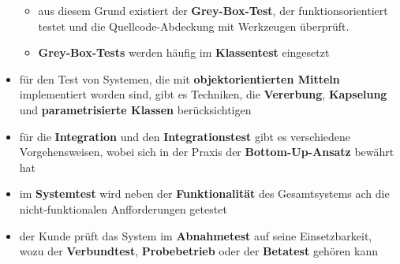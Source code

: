 \begin{itemize}
\begin{itemize}
        \item aus diesem Grund existiert der \textbf{Grey-Box-Test}, der funktionsorientiert testet und die Quellcode-Abdeckung mit Werkzeugen überprüft.
        \item \textbf{Grey-Box-Tests} werden häufig im \textbf{Klassentest} eingesetzt
    \end{itemize}
    \item für den Test von Systemen, die mit \textbf{objektorientierten Mitteln} implementiert worden sind, gibt es Techniken, die \textbf{Vererbung}, \textbf{Kapselung}  und \textbf{parametrisierte Klassen} berücksichtigen
    \item für die \textbf{Integration} und den \textbf{Integrationstest} gibt es verschiedene Vorgehensweisen, wobei sich in der Praxis der \textbf{Bottom-Up-Ansatz} bewährt hat
    \item im \textbf{Systemtest} wird neben der \textbf{Funktionalität} des Gesamtsystems ach die nicht-funktionalen Anfforderungen getestet
    \item der Kunde prüft das System im \textbf{Abnahmetest} auf seine Einsetzbarkeit, wozu der \textbf{Verbundtest}, \textbf{Probebetrieb} oder der \textbf{Betatest} gehören kann
\end{itemize}
